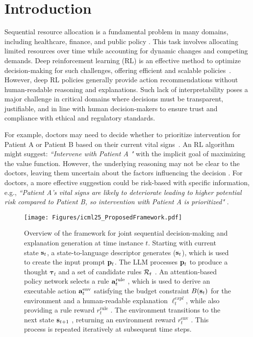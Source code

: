 \section{Introduction}


Sequential resource allocation is a fundamental problem in many domains, including healthcare, finance, and public policy \cite{considine2023optimizing,boehmer2024optimizing, yu2024fincon}. This task involves allocating limited resources over time while accounting for dynamic changes and competing demands. Deep reinforcement learning (RL) is an effective method to optimize decision-making for such challenges, offering efficient and scalable policies~\cite{yu2021reinforcement,talaat2022effective, xiong2023reinforcement,zhao2024towards}. However, deep RL policies generally provide action recommendations without human-readable reasoning and explanations. Such lack of interpretability poses a major challenge in critical domains where decisions must be transparent, justifiable, and in line with human decision-makers to ensure trust and compliance with ethical and regulatory standards.



For example, doctors may need to decide whether to prioritize intervention for Patient A or Patient B based on their current vital signs~\cite{boehmer2024optimizing}. An RL algorithm might suggest: \textit{ ``Intervene with Patient A "} with the implicit goal of maximizing the value function. However, the underlying reasoning may not be clear to the doctors, leaving them uncertain about the factors influencing the decision \cite{milani2024explainable}. For doctors, a more effective suggestion could be risk-based with specific information, e.g., \textit{``Patient A's vital signs are likely to deteriorate leading to higher potential risk compared to Patient B, so intervention with Patient A is prioritized"} \cite{gebrael2023enhancing, boatin2021wireless}.




\begin{figure*}[tbp]
    \centering
    \texttt{[image: Figures/icml25\_ProposedFramework.pdf]}
    \caption{Overview of the \rbrl framework for joint sequential decision-making and explanation generation at time instance $t$. Starting with current state ${\mathbf{s}}_t$,  a state-to-language descriptor generates \lang(${\mathbf{s}}_t$), which is used to create the input prompt 
${\mathbf{p}}_t$. The LLM processes 
${\mathbf{p}}_t$
  to produce a thought 
$\pmb{\tau}_t$  and a set of candidate rules 
${\mathcal{R}}_t$ . An attention-based policy network selects a rule 
${\mathbf{a}}^{\text{rule}}_t$ , which is used to derive an executable action ${\mathbf{a}}^{\text{env}}_t$ satisfying the budget constraint $B({\mathbf{s}}_t)$ for the environment 
  and a human-readable explanation $\pmb{\ell}_t^{expl}$, while also providing a rule reward $r_t^{\text{rule}}$ 
 . The environment transitions to the next state 
${\mathbf{s}}_{t+1}$ , returning an environment reward $r_t^{\text{env}}$ 
 . This process is repeated iteratively at subsequent time steps. 
}
    \label{fig:Proposed_framework}
\end{figure*}


